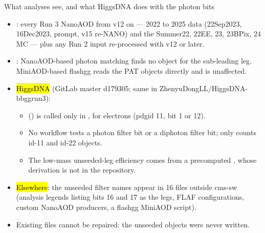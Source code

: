 \begin{frame}{What analyses see, and what HiggsDNA does with the photon bits}
  \begin{itemize}\small
    \item {}: every Run 3 NanoAOD from v12 on --- 2022 to 2025 data (22Sep2023, 16Dec2023, prompt,
          v15 re-NANO) and the Summer22, 22EE, 23, 23BPix, 24 MC --- plus any Run 2 input re-processed with v12 or later.
    \item {}: NanoAOD-based photon matching finds no object for the sub-leading leg. MiniAOD-based
          flashgg reads the PAT objects directly and is unaffected.
    \item \hl{HiggsDNA} (GitLab master d179305; same in ZhenyuDongLL/HiggsDNA-bbggrun3):
      \begin{itemize}\scriptsize
        \item {} () is called only in
              , for electrons (pdgid 11, bit 1 or 12).
        \item No workflow tests a photon filter bit or a diphoton filter bit; 
              only counts id-11 and id-22 objects.
        \item The low-mass unseeded-leg efficiency comes from a precomputed
              , whose derivation is not in the repository.
      \end{itemize}
    \item \hl{Elsewhere}: the unseeded filter names appear in 16 files outside cms-sw (analysis legends listing bits
          16 and 17 as the legs, FLAF configurations, custom NanoAOD producers, a flashgg MiniAOD script).
    \item Existing files cannot be repaired: the unseeded objects were never written.
  \end{itemize}
\end{frame}

